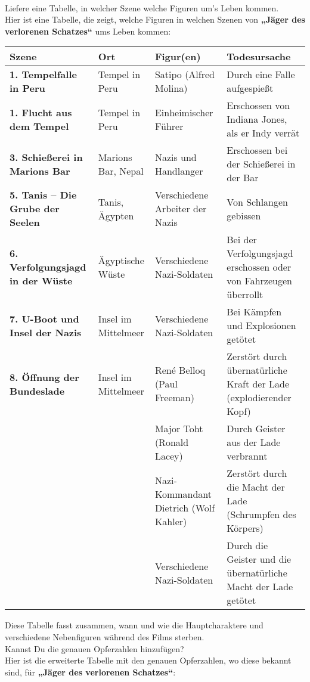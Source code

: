 \documentclass[a4paper]{article}
\begin{document}
\begin{dialogue}
 \leavevmode\\
Liefere eine Tabelle, in welcher Szene welche Figuren um's Leben kommen.
 \leavevmode\\
Hier ist eine Tabelle, die zeigt, welche Figuren in welchen Szenen von \textbf{„Jäger des verlorenen Schatzes“} ums Leben kommen:

\begin{table}[h]
\centering
\small
\begin{tabu} to \linewidth { |X[m,c]|X[m,c]|X[m,c]|X[m,c]| }

\hline
Szene & Ort & Figur(en) & Todesursache\\\hline 
\hline
\textbf{1. Tempelfalle in Peru} & Tempel in Peru & Satipo (Alfred Molina) & Durch eine Falle aufgespießt\\\hline 
\textbf{1. Flucht aus dem Tempel} & Tempel in Peru & Einheimischer Führer & Erschossen von Indiana Jones, als er Indy verrät\\\hline 
\textbf{3. Schießerei in Marions Bar} & Marions Bar, Nepal & Nazis und Handlanger & Erschossen bei der Schießerei in der Bar\\\hline 
\textbf{5. Tanis – Die Grube der Seelen} & Tanis, Ägypten & Verschiedene Arbeiter der Nazis & Von Schlangen gebissen\\\hline 
\textbf{6. Verfolgungsjagd in der Wüste} & Ägyptische Wüste & Verschiedene Nazi-Soldaten & Bei der Verfolgungsjagd erschossen oder von Fahrzeugen überrollt\\\hline 
\textbf{7. U-Boot und Insel der Nazis} & Insel im Mittelmeer & Verschiedene Nazi-Soldaten & Bei Kämpfen und Explosionen getötet\\\hline 
\textbf{8. Öffnung der Bundeslade} & Insel im Mittelmeer & René Belloq (Paul Freeman) & Zerstört durch übernatürliche Kraft der Lade (explodierender Kopf)\\\hline 
 &  & Major Toht (Ronald Lacey) & Durch Geister aus der Lade verbrannt\\\hline 
 &  & Nazi-Kommandant Dietrich (Wolf Kahler) & Zerstört durch die Macht der Lade (Schrumpfen des Körpers)\\\hline 
 &  & Verschiedene Nazi-Soldaten & Durch die Geister und die übernatürliche Macht der Lade getötet\\\hline 
\end{tabu}
\end{table}

Diese Tabelle fasst zusammen, wann und wie die Hauptcharaktere und verschiedene Nebenfiguren während des Films sterben.
 \leavevmode\\
Kannst Du die genauen Opferzahlen hinzufügen?
 \leavevmode\\
Hier ist die erweiterte Tabelle mit den genauen Opferzahlen, wo diese bekannt sind, für \textbf{„Jäger des verlorenen Schatzes“}:


\end{dialogue}
\end{document}
